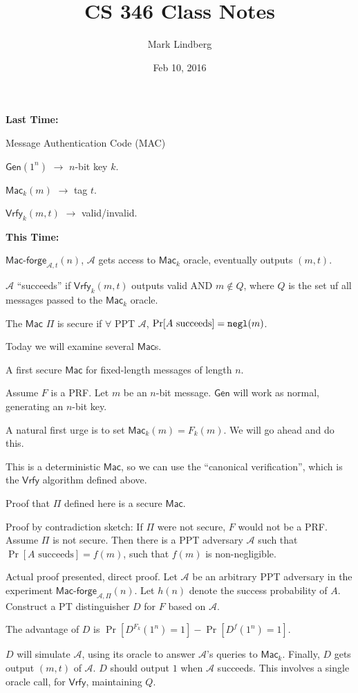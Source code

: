 \documentclass[12pt]{article}
\newcommand{\AAA}{\mathcal{A}}
\newcommand{\Mac}{\mathsf{Mac}}
\newcommand{\Macf}{\mathsf{Mac\text{-}forge}}
\newcommand{\Vrfy}{\mathsf{Vrfy}}
\newcommand{\Gen}{\mathsf{Gen}}
\newcommand{\negl}{{\tt negl}}
\begin{document}
\title{CS 346 Class Notes}
\date{Feb 10, 2016}
\author{Mark Lindberg}
\maketitle
\thispagestyle{fancy}

{\bf Last Time:}

Message Authentication Code (MAC)

$\Gen(1^n)$ $\to$ $n$-bit key $k$.

$\Mac_k(m)$ $\to$ tag $t$.

$\Vrfy_k(m,t)$ $\to$ valid/invalid.

{\bf This Time:}

$\Macf_{\AAA,t}(n)$, $\AAA$ gets access to $\Mac_k$ oracle, eventually outputs $(m,t)$.

$\AAA$ ``succeeds'' if $\Vrfy_k(m,t)$ outputs valid AND $m\not\in Q$, where $Q$ is the set uf all messages passed to the $\Mac_k$ oracle.

The $\Mac$ $\Pi$ is secure if $\forall$ PPT $\AAA$, $\Pr[A\text{ succeeds}]=\negl(m)$.

Today we will examine several $\Mac$s.

A first secure $\Mac$ for fixed-length messages of length $n$.

Assume $F$ is a PRF. Let $m$ be an $n$-bit message. $\Gen$ will work as normal, generating an $n$-bit key.

A natural first urge is to set $\Mac_k(m)=F_k(m)$. We will go ahead and do this.

This is a deterministic $\Mac$, so we can use the ``canonical verification'', which is the $\Vrfy$ algorithm defined above.

Proof that $\Pi$ defined here is a secure $\Mac$.

Proof by contradiction sketch: If $\Pi$ were not secure, $F$ would not be a PRF. Assume $\Pi$ is not secure. Then there is a PPT adversary $\AAA$ such that $\Pr[A\text{ succeeds}]=f(m)$, such that $f(m)$ is non-negligible.

Actual proof presented, direct proof. Let $\AAA$ be an arbitrary PPT adversary in the experiment $\Macf_{\AAA,\Pi}(n)$. Let $h(n)$ denote the success probability of $A$. Construct a PT distinguisher $D$ for $F$ based on $\AAA$.

The advantage of $D$ is $\Pr[D^{F_k}(1^n)=1]-\Pr[D^{f}(1^n)=1]$.

$D$ will simulate $\AAA$, using its oracle to answer $\AAA$'s queries to $\Mac_k$. Finally, $D$ gets output $(m,t)$ of $\AAA$. $D$ should output $1$ when $\AAA$ succeeds. This involves a single oracle call, for $\Vrfy$, maintaining $Q$.
\end{document}
